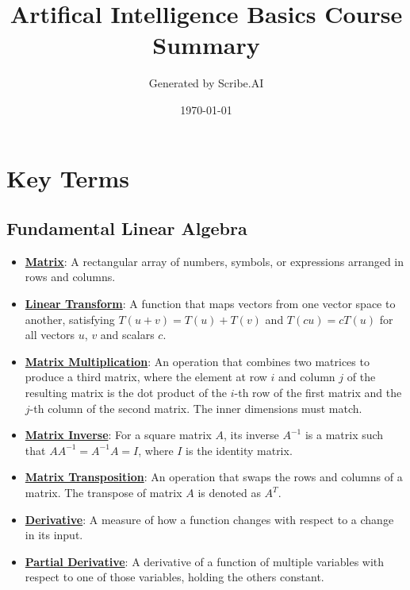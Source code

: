 \documentclass{article}%
\title{Artifical Intelligence Basics Course Summary}%
\author{Generated by Scribe.AI}%
\date{\today}%
\begin{document}
%
\normalsize%
\maketitle%
\section{Key Terms}%
\label{sec:KeyTerms}%
\subsection{Fundamental Linear Algebra}%
\label{subsec:FundamentalLinearAlgebra}%
\begin{itemize}[leftmargin=*]%
\item \href{https://www.math.purdue.edu/~yipn/351/04L1-Linear Algebra Primer.pdf#page=4}{\textbf{Matrix}}: A rectangular array of numbers, symbols, or expressions arranged in rows and columns.%
\item \href{https://www.math.purdue.edu/~yipn/351/04L1-Linear Algebra Primer.pdf#page=5}{\textbf{Linear Transform}}: A function that maps vectors from one vector space to another, satisfying $T(u + v) = T(u) + T(v)$ and $T(cu) = cT(u)$ for all vectors $u$, $v$ and scalars $c$.%
\item \href{https://www.math.purdue.edu/~yipn/351/04L1-Linear Algebra Primer.pdf#page=14}{\textbf{Matrix Multiplication}}: An operation that combines two matrices to produce a third matrix, where the element at row $i$ and column $j$ of the resulting matrix is the dot product of the $i$-th row of the first matrix and the $j$-th column of the second matrix. The inner dimensions must match.%
\item \href{https://www.math.purdue.edu/~yipn/351/04L1-Linear Algebra Primer.pdf#page=10}{\textbf{Matrix Inverse}}: For a square matrix $A$, its inverse $A^{-1}$ is a matrix such that $AA^{-1} = A^{-1}A = I$, where $I$ is the identity matrix.%
\item \href{https://www.math.purdue.edu/~yipn/351/04L1-Linear Algebra Primer.pdf#page=16}{\textbf{Matrix Transposition}}: An operation that swaps the rows and columns of a matrix. The transpose of matrix $A$ is denoted as $A^T$.%
\item \href{https://www.math.purdue.edu/~yipn/351/04L1-Linear Algebra Primer.pdf#page=21}{\textbf{Derivative}}: A measure of how a function changes with respect to a change in its input.%
\item \href{https://www.math.purdue.edu/~yipn/351/04L1-Linear Algebra Primer.pdf#page=19}{\textbf{Partial Derivative}}: A derivative of a function of multiple variables with respect to one of those variables, holding the others constant.%

\end{itemize}
\end{document}
